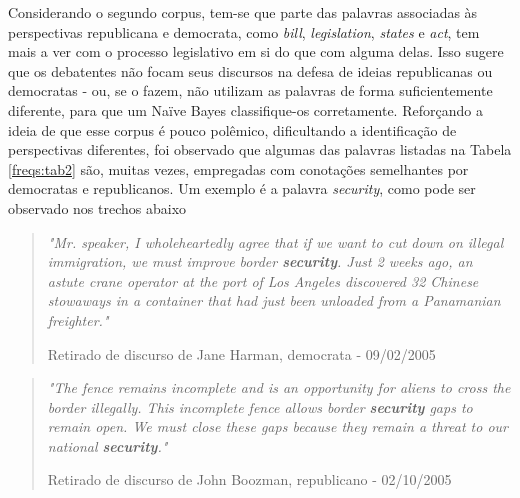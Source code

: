 

Considerando o segundo corpus, tem-se que parte das palavras associadas às perspectivas republicana e democrata, como \emph{bill}, \emph{legislation}, \emph{states} e \emph{act}, tem mais a ver com o processo legislativo em si do que com alguma delas. Isso sugere que os debatentes não focam seus discursos na defesa de ideias republicanas ou democratas - ou, se o fazem, não utilizam as palavras de forma suficientemente diferente,  para que um Naïve Bayes classifique-os corretamente. Reforçando a ideia de que esse corpus é pouco polêmico, dificultando a identificação de perspectivas diferentes, foi observado que algumas das palavras listadas na Tabela \ref{freqs:tab2} são, muitas vezes, empregadas com conotações semelhantes por democratas e republicanos. Um exemplo é a palavra \emph{security}, como pode ser observado nos trechos abaixo

\begin{quote}
\emph{"Mr. speaker, I wholeheartedly agree that if we want to cut down on illegal immigration, we must improve border \textbf{security}. Just 2 weeks ago, an astute crane operator at the port of Los Angeles discovered 32 Chinese stowaways in a container that had just been unloaded from a Panamanian freighter."} 

{\small Retirado de discurso de Jane Harman, democrata - 09/02/2005 }

\end{quote}

\begin{quote}
\emph{"The fence remains incomplete and is an opportunity for aliens to cross the border illegally. This incomplete fence allows border \textbf{security} gaps to remain open.  We must close these gaps because they remain a threat to our national \textbf{security}."}

{\small Retirado de discurso de John Boozman, republicano - 02/10/2005}

\end{quote}

